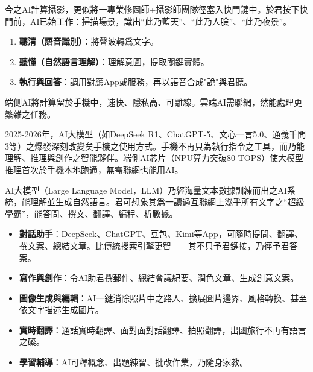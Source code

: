 


今之AI計算攝影，更似將一專業修圖師+攝影師團隊徑塞入快門鍵中。於君按下快門前，AI已始工作：掃描場景，識出“此乃藍天”、“此乃人臉”、“此乃夜景”。


\begin{enumerate}
  \item \textbf{聽清（語音識別）}：將聲波轉爲文字。
  \item \textbf{聽懂（自然語言理解）}：理解意圖，提取關鍵實體。
  \item \textbf{執行與回答}：調用對應App或服務，再以語音合成"說"與君聽。
\end{enumerate}


端側AI將計算留於手機中，速快、隱私高、可離線。雲端AI需聯網，然能處理更繁雜之任務。


2025-2026年，AI大模型（如DeepSeek R1、ChatGPT-5、文心一言5.0、通義千問3等）之爆發深刻改變矣手機之使用方式。手機不再只為執行指令之工具，而乃能理解、推理與創作之智能夥伴。端側AI芯片（NPU算力突破80 TOPS）使大模型推理首次於手機本地跑通，無需聯網也能用AI。


AI大模型（Large Language Model，LLM）乃經海量文本數據訓練而出之AI系統，能理解並生成自然語言。君可想象其爲一讀過互聯網上幾乎所有文字之“超級學霸”，能答問、撰文、翻譯、編程、析數據。


\begin{itemize}
  \item \textbf{對話助手}：DeepSeek、ChatGPT、豆包、Kimi等App，可隨時提問、翻譯、撰文案、總結文章。比傳統搜索引擎更智——其不只予君鏈接，乃徑予君答案。
  \item \textbf{寫作與創作}：令AI助君撰郵件、總結會議紀要、潤色文章、生成創意文案。
  \item \textbf{圖像生成與編輯}：AI一鍵消除照片中之路人、擴展圖片邊界、風格轉換、甚至依文字描述生成圖片。
  \item \textbf{實時翻譯}：通話實時翻譯、面對面對話翻譯、拍照翻譯，出國旅行不再有語言之礙。
  \item \textbf{學習輔導}：AI可釋概念、出題練習、批改作業，乃隨身家教。
\end{itemize}

